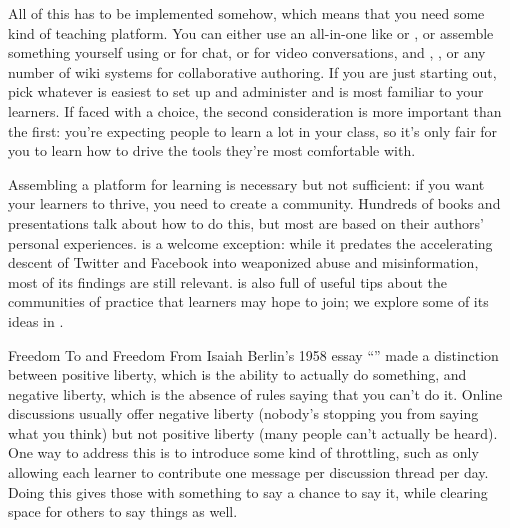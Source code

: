 All of this has to be implemented somehow,
which means that you need some kind of teaching platform.
You can either use an all-in-one 
like  or ,
or assemble something yourself
using  or  for chat,
or  for video conversations,
and ,
,
or any number of wiki systems for collaborative authoring.
If you are just starting out,
pick whatever is easiest to set up and administer
and is most familiar to your learners.
If faced with a choice,
the second consideration is more important than the first:
you're expecting people to learn a lot in your class,
so it's only fair for you to learn how to drive the tools they're most comfortable with.

Assembling a platform for learning is necessary but not sufficient:
if you want your learners to thrive,
you need to create a community.
Hundreds of books and presentations talk about how to do this,
but most are based on their authors' personal experiences.
\cite{Krau2016} is a welcome exception:
while it predates the accelerating descent of Twitter and Facebook into weaponized abuse and misinformation,
most of its findings are still relevant.
\cite{Foge2005} is also full of useful tips
about the communities of practice that learners may hope to join;
we explore some of its ideas in .

\begin{aside}{Freedom To and Freedom From}
  Isaiah Berlin's 1958 essay
  ``''
  made a distinction between positive liberty,
  which is the ability to actually do something,
  and negative liberty,
  which is the absence of rules saying that you can't do it.
  Online discussions usually offer negative liberty
  (nobody's stopping you from saying what you think)
  but not positive liberty
  (many people can't actually be heard).
  One way to address this is to introduce some kind of throttling,
  such as only allowing each learner to contribute one message per discussion thread per day.
  Doing this gives those with something to say a chance to say it,
  while clearing space for others to say things as well.
\end{aside}

